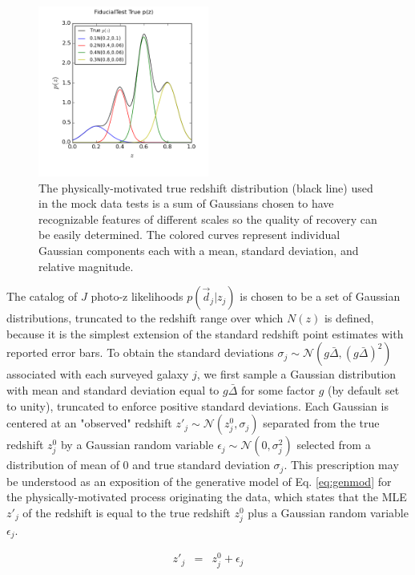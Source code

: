 \documentclass[preprint]{aastex}
\begin{document}
\begin{figure}
\includegraphics[width=0.5\textwidth]{figs/null/physPz.png}
\caption{The physically-motivated true redshift distribution (black line) used 
in the mock data tests is a sum of Gaussians chosen to have recognizable 
features of different scales so the quality of recovery can be easily 
determined.  The colored curves represent individual Gaussian components each 
with a mean, standard deviation, and relative magnitude.}
\label{fig:physpz}
\end{figure}

The catalog of $J$ photo-z likelihoods $p(\vec{d}_{j}|z_{j})$ is chosen to be a 
set of Gaussian distributions, truncated to the redshift range over which 
$N(z)$ is defined, because it is the simplest extension of the standard 
redshift point estimates with reported error bars.  To obtain the standard 
deviations $\sigma_{j}\sim\mathcal{N}(g\bar{\Delta},(g\bar{\Delta})^{2})$ 
associated with each surveyed galaxy $j$, we first sample a Gaussian 
distribution with mean and standard deviation equal to $g\bar{\Delta}$ for some 
factor $g$ (by default set to unity), truncated to enforce positive standard 
deviations.  Each Gaussian is centered at an "observed" redshift 
$z'_{j}\sim\mathcal{N}(z^{0}_{j},\sigma_{j})$ separated from the true redshift 
$z^{0}_{j}$ by a Gaussian random variable 
$\epsilon_{j}\sim\mathcal{N}(0,\sigma^{2}_{j})$ selected from a distribution of 
mean of 0 and true standard deviation $\sigma_{j}$.   This prescription may be 
understood as an exposition of the generative model of Eq. \ref{eq:genmod} for 
the physically-motivated process originating the data, which states that the 
MLE $z'_{j}$ of the redshift is equal to the true redshift $z^{0}_{j}$ plus a 
Gaussian random variable $\epsilon_{j}$.

\begin{eqnarray}
\label{eq:genmod}
z'_{j} &=& z^{0}_{j}+\epsilon_{j}
\end{eqnarray}
\end{document}
